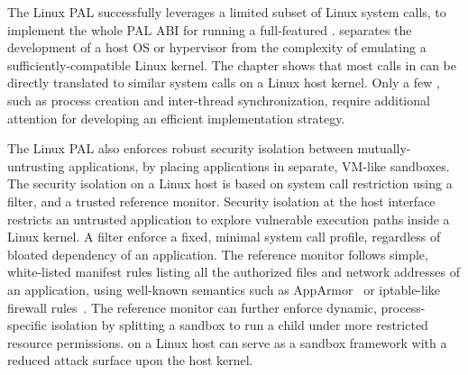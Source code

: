 


The Linux PAL successfully leverages a limited subset of Linux system calls,
to implement the whole PAL ABI for running a
full-featured \libos{}.
\Thehostabi{} separates the development of a host OS or hypervisor
from the complexity of emulating a sufficiently-compatible
Linux kernel.
The chapter shows that most calls in \thehostabi{}
can be directly translated to similar system calls on a Linux host kernel.
Only a few \hostapis{}, such as process creation and inter-thread synchronization, require additional attention for developing an efficient implementation strategy.



The Linux PAL also enforces robust security isolation
between mutually-untrusting applications,
by placing applications in separate, VM-like sandboxes.
The security isolation on a Linux host is based on system call restriction using a \seccomp{} filter, and a trusted reference monitor. %
Security isolation at the host interface
restricts an untrusted application to explore vulnerable execution paths
inside a Linux kernel.
A \seccomp{} filter 
enforce a fixed, minimal system call profile, regardless of bloated dependency of an application.
The reference monitor follows
simple, white-listed manifest rules listing 
all the authorized files and network addresses of an application,
using well-known semantics
such as AppArmor~\cite{apparmor} or iptable-like firewall rules~\cite{iptablesman}.
The reference monitor can further enforce dynamic, process-specific isolation by splitting a sandbox
to run a child \picoproc{} under more restricted
resource permissions.
\graphene{} on a Linux host can serve as a sandbox framework
with a reduced attack surface
upon the host kernel.







